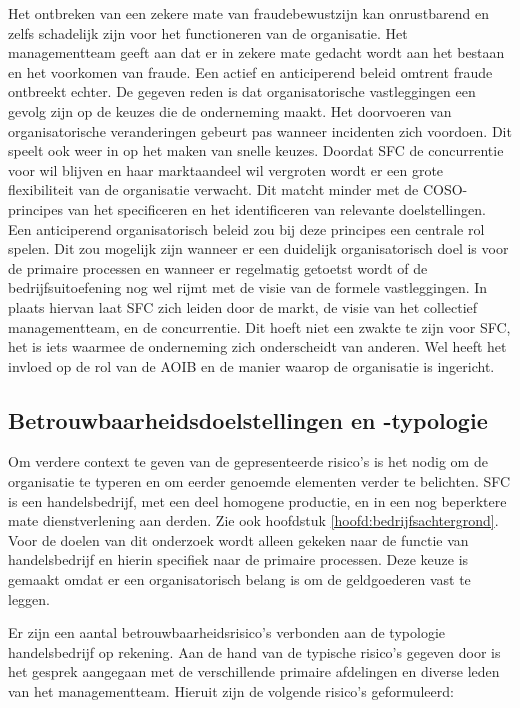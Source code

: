 Het ontbreken van een zekere mate van fraudebewustzijn kan onrustbarend en zelfs schadelijk zijn voor het functioneren van de organisatie. Het managementteam geeft aan dat er in zekere mate gedacht wordt aan het bestaan en het voorkomen van fraude. Een actief en anticiperend beleid omtrent fraude ontbreekt echter. De gegeven reden is dat organisatorische vastleggingen een gevolg zijn op de keuzes die de onderneming maakt. Het doorvoeren van organisatorische veranderingen gebeurt pas wanneer incidenten zich voordoen. Dit speelt ook weer in op het maken van snelle keuzes. Doordat SFC de concurrentie voor wil blijven en haar marktaandeel wil vergroten wordt er een grote flexibiliteit van de organisatie verwacht. Dit matcht minder met de COSO-principes van het specificeren en het identificeren van relevante doelstellingen. Een anticiperend organisatorisch beleid zou bij deze principes een centrale rol spelen. Dit zou mogelijk zijn wanneer er een duidelijk organisatorisch doel is voor de primaire processen en wanneer er regelmatig getoetst wordt of de bedrijfsuitoefening nog wel rijmt met de visie van de formele vastleggingen. In plaats hiervan laat SFC zich leiden door de markt, de visie van het collectief managementteam, en de concurrentie. Dit hoeft niet een zwakte te zijn voor SFC, het is iets waarmee de onderneming zich onderscheidt van anderen. Wel heeft het invloed op de rol van de AOIB en de manier waarop de organisatie is ingericht. 


\subsection{Betrouwbaarheidsdoelstellingen en -typologie}
Om verdere context te geven van de gepresenteerde risico's is het nodig om de organisatie te typeren en om eerder genoemde elementen verder te belichten. SFC is een handelsbedrijf, met een deel homogene productie, en in een nog beperktere mate dienstverlening aan derden. Zie ook hoofdstuk \ref{hoofd:bedrijfsachtergrond}. Voor de doelen van dit onderzoek wordt alleen gekeken naar de functie van handelsbedrijf en hierin specifiek naar de primaire processen. Deze keuze is gemaakt omdat er een organisatorisch belang is om de \gls{geldgoederen} vast te leggen. 

Er zijn een aantal betrouwbaarheidsrisico's verbonden aan de typologie handelsbedrijf op rekening. Aan de hand van de typische risico's gegeven door \citet{bivperspectief} is het gesprek aangegaan met de verschillende primaire afdelingen en diverse leden van het managementteam. Hieruit zijn de volgende risico's geformuleerd:

